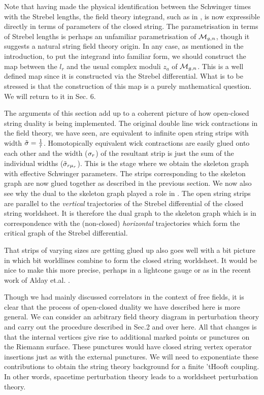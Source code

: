 Note that having made the physical identification 
between the Schwinger times with the Strebel lengths, 
the field theory integrand, such as in \schem , is now expressible
directly in terms of parameters of the closed string. The parametrisation 
in terms of Strebel lengths is perhaps an unfamiliar parametrisation of 
${\cal M}_{g,n}$, though it suggests a natural string field 
theory origin. In any case, as mentioned
in the introduction, to put the integrand into familiar form, we should
construct the map  
between the $l_r$ and the usual complex moduli $z_a$
of ${\cal M}_{g,n}$. 
This is a well defined map since it is 
constructed via the Strebel differential.
What is to be stressed is that the construction of this map
is a purely mathematical
question. We will return to it in Sec. 6. 


The arguments of this section
add up to a coherent picture of how open-closed string
duality is being implemented. 
The original double line wick contractions 
in the field theory, we have seen, are equivalent 
to infinite open string strips with width $\tilde{{\sigma}}={1\over \tilde{{\tau}}}$. 
Homotopically
equivalent wick contractions are easily glued onto each other and the 
width (${\sigma}_r$) of the resultant strip
is just the sum of the individual widths ($\tilde{{\sigma}}_{r{\mu}_r}$). 
This is the stage where 
we obtain the skeleton graph with effective Schwinger parameters. The 
strips corresponding to the skeleton graph are now glued together as
described in the previous section. We now also see why 
the dual to the skeleton graph played a role in \ffb .
The open string strips are parallel to the
{\it vertical} trajectories of the Strebel differential of the 
closed string worldsheet. It is therefore the  
dual graph to the skeleton graph which is in correspondence with the 
(non-closed) {\it horizontal} trajectories which form the critical graph 
of the Strebel differential. 

That strips of varying sizes are getting glued up also goes well 
with a bit picture in which bit worldlines combine to form
the closed string worldsheet. It would be nice to make 
this more precise, perhaps in a lightcone gauge or as in the 
recent work of Alday et.al. \justin .

Though we had mainly discussed correlators in the 
context of free fields, it is clear 
that the process of open-closed duality we have described here is more
general. We can consider an arbitrary field theory diagram in 
perturbation theory and carry out the procedure described in Sec.2 
and over here. All that changes is that the internal vertices 
give rise to additional marked points or punctures 
on the Riemann surface. These punctures would have closed 
string vertex operator insertions just as with the external punctures.   
We will need to exponentiate these contributions to obtain the string 
theory background for a finite 'tHooft coupling. In other words,  
spacetime perturbation theory leads to a worldsheet perturbation 
theory. 

